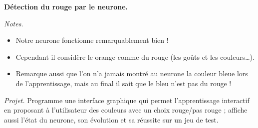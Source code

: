 \documentclass[11pt,class=report,crop=false]{standalone}
\begin{document}
\begin{activite}[Neurone]
\begin{enumerate}
\begin{center}
\begin{tabular}{|c|c|c|c|c|}
	\end{tabular}

  {\bf Détection du rouge par le neurone.}
\end{center} 	
	
	\medskip
	
\emph{Notes.} 
\begin{itemize}
	\item Notre neurone fonctionne remarquablement bien ! 
	\item Cependant il considère le orange comme du rouge (les goûts et les couleurs\ldots).
	\item Remarque aussi que l'on n'a jamais montré au neurone la couleur bleue lors de l'apprentissage, mais au final il sait que le bleu n'est pas du rouge !
\end{itemize}	
	
\end{enumerate}


\emph{Projet.} Programme une interface graphique qui permet l'apprentissage interactif en proposant à l'utilisateur des couleurs avec un choix \og{}rouge/pas rouge\fg{} ; affiche aussi l'état du neurone, son évolution et sa réussite sur un jeu de test.
\end{activite}
\end{document}
